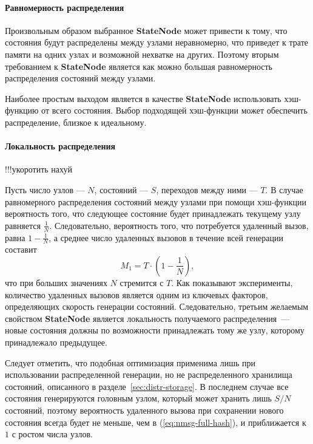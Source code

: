 \documentclass[12pt,a4paper,fleqn]{article}
\newcommand{\Code}[1]{\textbf{\mbox{#1}}}
\begin{document}
\paragraph{Равномерность распределения}

Произвольным образом выбранное \Code{StateNode} может привести к тому, что состояния будут
распределены между узлами неравномерно, что приведет к трате памяти на одних узлах и
возможной нехватке на других. Поэтому вторым требованием к \Code{StateNode} является как
можно большая равномерность распределения состояний между узлами. 

Наиболее простым выходом является в качестве \Code{StateNode} использовать хэш-функцию от
всего состояния. Выбор подходящей хэш-функции может обеспечить распределение, близкое к
идеальному.

\paragraph{Локальность распределения}

!!!укоротить нахуй

Пусть число узлов — $N$, состояний — $S$, переходов между ними — $T$. В случае
равномерного распределения состояний между узлами при помощи хэш-функции вероятность того,
что следующее состояние будет принадлежать текущему узлу равняется
$\frac{1}{N}$. Следовательно, вероятность того, что потребуется удаленный вызов, равна $1
- \frac{1}{N}$, а среднее число удаленных вызовов в течение всей генерации составит
\begin{equation}
  \label{eq:nmsg-full-hash}
  M_1 = T \cdot (1 - \frac{1}{N}) ,
\end{equation}
что при больших значениях $N$ стремится с $T$. Как показывают эксперименты, количество
удаленных вызовов является одним из ключевых факторов, определяющих скорость генерации
состояний. Следовательно, третьим желаемым свойством \Code{StateNode} является локальность
получаемого распределения~--- новые состояния должны по возможности принадлежать тому же
узлу, которому принадлежало предыдущее.

Следует отметить, что подобная оптимизация применима лишь при использовании распределенной
генерации, но не распределенного хранилища состояний, описанного в
разделе~\ref{sec:distr-storage}. В последнем случае все состояния генерируются головным
узлом, который может хранить лишь $S/N$ состояний, поэтому вероятность удаленного вызова
при сохранении нового состояния всегда будет не меньше, чем в (\ref{eq:nmsg-full-hash}), и
приближается к $1$ с ростом числа узлов.
\end{document}
